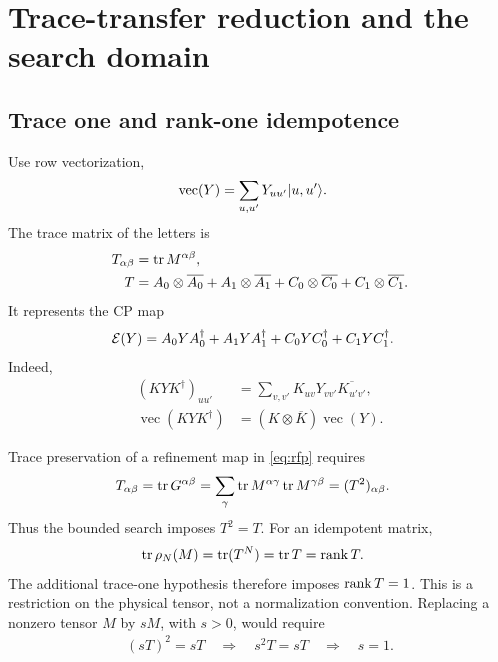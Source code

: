 \section{Trace-transfer reduction and the search domain}
\label{sec:transfer}

\subsection{Trace one and rank-one idempotence}

Use row vectorization,
\begin{align}
	\operatorname{vec}(Y) & =\sum_{u,u'}Y_{uu'}\lvert u,u'\rangle.
\end{align}
The trace matrix of the letters is
\begin{align}
	T_{\alpha\beta} & =\operatorname{tr} M^{\alpha\beta},
	\nonumber                                   \\
	T               & =A_0\otimes\overline{A_0}
	+A_1\otimes\overline{A_1}
	+C_0\otimes\overline{C_0}
	+C_1\otimes\overline{C_1}.
	\label{eq:trace-matrix}
\end{align}
It represents the CP map
\begin{align}
	\mathcal{E}(Y)
	 & =A_0YA_0^\dagger+A_1YA_1^\dagger
	+C_0YC_0^\dagger+C_1YC_1^\dagger.
	\label{eq:transfer-map}
\end{align}
Indeed,
\begin{align}
	(KYK^\dagger)_{uu'}
	 & =\sum_{v,v'}K_{uv}Y_{vv'}\overline{K_{u'v'}},
	\nonumber                                        \\
	\operatorname{vec}(KYK^\dagger)
	 & =(K\otimes\overline K)\operatorname{vec}(Y).
\end{align}

Trace preservation of a refinement map in \cref{eq:rfp} requires
\begin{align}
	T_{\alpha\beta}
	 & =\operatorname{tr} G^{\alpha\beta}
	=\sum_\gamma
	\operatorname{tr} M^{\alpha\gamma}\operatorname{tr} M^{\gamma\beta}
	=(T^2)_{\alpha\beta}.
	\label{eq:idempotence}
\end{align}
Thus the bounded search imposes $T^2=T$. For an idempotent matrix,
\begin{align}
	\operatorname{tr}\rho_N(M) & =\operatorname{tr}(T^N)=\operatorname{tr} T=\operatorname{rank} T.
	\label{eq:trace-one}
\end{align}
The additional trace-one hypothesis therefore imposes $\operatorname{rank} T=1$.
This is a restriction on the physical tensor, not a normalization
convention. Replacing a nonzero tensor $M$ by $sM$, with $s>0$,
would require
\begin{align}
	(sT)^2=sT
	\quad\Longrightarrow\quad
	s^2T=sT
	\quad\Longrightarrow\quad
	s=1.
	\label{eq:no-rescaling}
\end{align}

